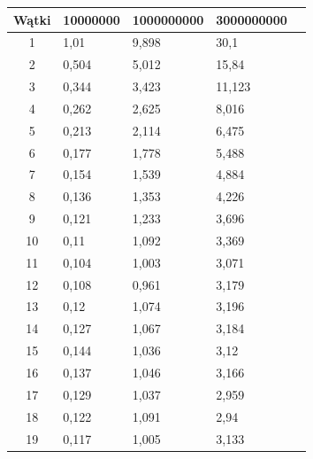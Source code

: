 \begin{longtable}[c]{|c|l|l|l|l}
  \cline{1-4}
  \multicolumn{1}{|l|}{Wątki} & 10000000 & 1000000000 & 3000000000 & \\ \cline{1-4}
  \endfirsthead
  \endhead
  1                           & 1,01     & 9,898      & 30,1       & \\ \cline{1-4}
  2                           & 0,504    & 5,012      & 15,84      & \\ \cline{1-4}
  3                           & 0,344    & 3,423      & 11,123     & \\ \cline{1-4}
  4                           & 0,262    & 2,625      & 8,016      & \\ \cline{1-4}
  5                           & 0,213    & 2,114      & 6,475      & \\ \cline{1-4}
  6                           & 0,177    & 1,778      & 5,488      & \\ \cline{1-4}
  7                           & 0,154    & 1,539      & 4,884      & \\ \cline{1-4}
  8                           & 0,136    & 1,353      & 4,226      & \\ \cline{1-4}
  9                           & 0,121    & 1,233      & 3,696      & \\ \cline{1-4}
  10                          & 0,11     & 1,092      & 3,369      & \\ \cline{1-4}
  11                          & 0,104    & 1,003      & 3,071      & \\ \cline{1-4}
  12                          & 0,108    & 0,961      & 3,179      & \\ \cline{1-4}
  13                          & 0,12     & 1,074      & 3,196      & \\ \cline{1-4}
  14                          & 0,127    & 1,067      & 3,184      & \\ \cline{1-4}
  15                          & 0,144    & 1,036      & 3,12       & \\ \cline{1-4}
  16                          & 0,137    & 1,046      & 3,166      & \\ \cline{1-4}
  17                          & 0,129    & 1,037      & 2,959      & \\ \cline{1-4}
  18                          & 0,122    & 1,091      & 2,94       & \\ \cline{1-4}
  19                          & 0,117    & 1,005      & 3,133      & \\ \cline{1-4}

\end{longtable}
